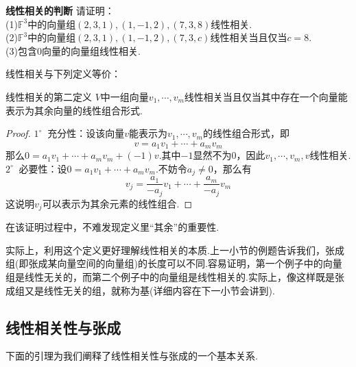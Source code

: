 \documentclass[lang=cn, zihao=5]{elegantbook}
\newcommand{\F}{\mathbb{F}}
\newcommand{\buzhou}[1]{$#1^{\circ} \ $}
\newcommand{\examplefont}[1]{\color{mgreen} \textbf{#1}}
\begin{document}
\begin{example}{\examplefont{线性相关的判断}}
	请证明： \\
	(1)$\F ^{3}$中的向量组$(2,3,1),(1,-1,2),(7,3,8)$线性相关. \\
	(2)$\F ^{3}$中的向量组$(2,3,1),(1,-1,2),(7,3,c)$线性相关当且仅当$c=8$. \\
	(3)包含$0$向量的向量组线性相关.
\end{example}

线性相关与下列定义等价：

\begin{proposition}{线性相关的第二定义}
	$V$中一组向量$v_1, \cdots ,v_m$线性相关当且仅当其中存在一个向量能表示为其余向量的线性组合形式.
\end{proposition}
\begin{proof}
	\buzhou{1} 充分性：设该向量$v$能表示为$v_1, \cdots ,v_m$的线性组合形式，即$$v= a_1v_1 + \cdots + a_mv_m$$
	那么$0=a_1v_1 + \cdots + a_mv_m + (-1)v$.其中$-1$显然不为$0$，因此$v_1, \cdots ,v_m,v$线性相关. \\
	\buzhou{2} 必要性：设$0=a_1v_1 + \cdots + a_mv_m$.不妨令$a_j \neq 0$，那么有$$v_j = \frac{a_1}{-a_j} v_1 + \cdots + \frac{a_m}{-a_j} v_m$$
	这说明$v_j$可以表示为其余元素的线性组合.
\end{proof}
\begin{remark}
	在该证明过程中，不难发现定义里“其余”的重要性.
\end{remark}

实际上，利用这个定义更好理解线性相关的本质.上一小节的例题告诉我们，张成组(即张成某向量空间的向量组)的长度可以不同.容易证明，第一个例子中的向量组是线性无关的，而第二个例子中的向量组是线性相关的.实际上，像这样既是张成组又是线性无关的组，就称为基(详细内容在下一小节会讲到).


\subsection{线性相关性与张成}

下面的引理为我们阐释了线性相关性与张成的一个基本关系.
\end{document}

